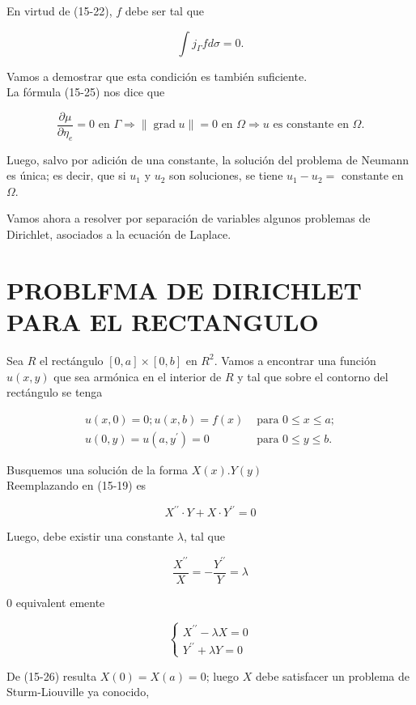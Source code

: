 \documentclass[10pt]{article}
\theoremstyle{plain}
\theoremstyle{definition}
\theoremstyle{remark}
\begin{document}
En virtud de (15-22), $f$ debe ser tal que

$$
\int j_{\Gamma} f d \sigma=0 .
$$

Vamos a demostrar que esta condición es también suficiente.\\
La fórmula (15-25) nos dice que

$$
\frac{\partial \mu}{\partial \eta_{e}}=0 \text { en } \Gamma \Rightarrow\|\operatorname{grad} u\|=0 \text { en } \Omega \Rightarrow u \text { es constante en } \Omega .
$$

Luego, salvo por adición de una constante, la solución del problema de Neumann es única; es decir, que si $u_{1}$ y $u_{2}$ son soluciones, se tiene $u_{1}-u_{2}=$ constante en $\Omega$.

Vamos ahora a resolver por separación de variables algunos problemas de Dirichlet, asociados a la ecuación de Laplace.

\section*{PROBLFMA DE DIRICHLET PARA EL RECTANGULO}
Sea $R$ el rectángulo $[0, a] \times[0, b]$ en $R^{2}$. Vamos a encontrar una función $u(x, y)$ que sea armónica en el interior de $R$ y tal que sobre el contorno del rectángulo se tenga

\[
\begin{array}{ll}
u(x, 0)=0 ; u(x, b)=f(x) & \text { para } 0 \leqslant x \leqslant a ; \\
u(0, y)=u\left(a, y^{\prime}\right)=0 & \text { para } 0 \leqslant y \leqslant b . \tag{15-26}
\end{array}
\]

Busquemos una solución de la forma $X(x) . Y(y)$\\
Reemplazando en (15-19) es

$$
X^{\prime \prime} \cdot Y+X \cdot Y^{\prime \prime}=0
$$

Luego, debe existir una constante $\lambda$, tal que

$$
\frac{X^{\prime \prime}}{X}=-\frac{Y^{\prime \prime}}{Y}=\lambda
$$

0 equivalent emente

$$
\left\{\begin{array}{l}
X^{\prime \prime}-\lambda X=0 \\
Y^{\prime \prime}+\lambda Y=0
\end{array}\right.
$$

De (15-26) resulta $X(0)=X(a)=0$; luego $X$ debe satisfacer un problema de Sturm-Liouville ya conocido,
\end{document}
